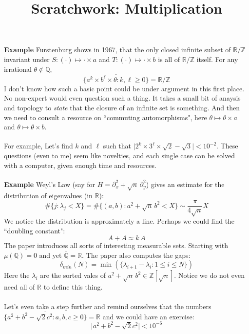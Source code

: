 \documentclass[12pt]{article}
\title{Scratchwork: Multiplication}
\date{}
\begin{document}
\sffamily

\maketitle

\noindent 
\textbf{Example} Furstenburg shows in 1967, that the only closed infinite subset of $\mathbb{R}/\mathbb{Z}$ invariant under  $S:(\cdot) \mapsto \cdot \times a$ and $T:(\cdot) \mapsto \cdot \times b$ is all of $\mathbb{R}/\mathbb{Z}$ itself.  For any irrational $\theta \notin \mathbb{Q}$, 
$$ \overline{ \{ a^k \times b^\ell \times \theta : k, \ell \geq 0 \} } = \mathbb{R}/\mathbb{Z} $$
I don't know how such a basic point could be under argument in this first place.  No non-expert would even question such a thing.  It takes a small bit of anaysis and topology to \textit{state} that the closure of an infinite set is something.  And then we need to consult a resource on ``commuting automorphisms", here $\theta \mapsto \theta \times a$ and $\theta \mapsto \theta \times b$. \\ \\ 
For example, Let's find $k$ and $\ell$ such that $\big|2^k \times 3^\ell \times \sqrt{2} - \sqrt{3} \big| < 10^{-2}$.  These questions (even to me) seem like novelties, and each single case can be solved with a computer, given enough time and resources.\\ \\
\textbf{Example} Weyl's Law (say for $H = \partial^2_x + \sqrt{n} \, \partial^2_y$) gives an estimate for the distribution of eigenvalues (in $\mathbb{R}$):
$$ \# \{ j : \lambda_j < X \} = \# \{ (a,b) : a^2 + \sqrt{n} \, b^2 < X \} \sim
\frac{\pi}{4 \sqrt{n}} X  $$ 
We notice the distribution is approximately a line.  Perhaps we could find the ``doubling constant": 
$$ A + A \approx k\, A $$ 
The paper introduces all sorts of interesting measurable sets.  Starting with $\mu(\mathbb{Q}) = 0$ and yet $\overline{\mathbb{Q}} = \mathbb{R}$. The paper also computes the gaps:
$$ \delta_{min}(N) = \min (\{\lambda_{i+1} - \lambda_i : 1 \leq i \leq N \})  $$
Here the $\lambda_i$ are the sorted vales of $a^2 + \sqrt{n} \, b^2 \in \mathbb{Z}[\sqrt{n}]$.  Notice we do not even need all of $\mathbb{R}$ to define this thing. \\ \\
Let's even take a step further and remind ourselves that the numbers $\overline{\{a^2 + b^2 - \sqrt{2} c^2 : a,b, c \geq 0 \}} = \mathbb{R}$ and we could have an exercise:
$$ \big| a^2 + b^2 - \sqrt{2} c^2 \big| < 10^{-6} $$
\end{document}
